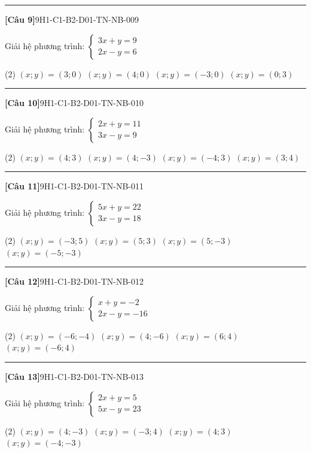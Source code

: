\documentclass[12pt,a4paper]{article}
\newif\ifloigiai
\newenvironment{cauhoi}[2]{%
  \par\medskip\noindent\rule{\textwidth}{0.4pt}\par\nopagebreak
  \noindent\textbf{[#1]}\hfill{\scriptsize\ttfamily #2}\par\nopagebreak\smallskip}{\par}
\newcommand{\dapan}[1]{\ifloigiai\par\smallskip\noindent\textit{Đáp án:} \textbf{#1}\par\fi}
\begin{document}
\begin{cauhoi}{Câu 9}{9H1-C1-B2-D01-TN-NB-009}
Giải hệ phương trình: $\begin{cases}3x + y=9\\ 2x - y=6\end{cases}$
\begin{tasks}(2)
\task $(x;y)=(3;0)$
\task $(x;y)=(4;0)$
\task $(x;y)=(-3;0)$
\task $(x;y)=(0;3)$
\end{tasks}
\dapan{A}
\end{cauhoi}
\begin{cauhoi}{Câu 10}{9H1-C1-B2-D01-TN-NB-010}
Giải hệ phương trình: $\begin{cases}2x + y=11\\ 3x - y=9\end{cases}$
\begin{tasks}(2)
\task $(x;y)=(4;3)$
\task $(x;y)=(4;-3)$
\task $(x;y)=(-4;3)$
\task $(x;y)=(3;4)$
\end{tasks}
\dapan{A}
\end{cauhoi}
\begin{cauhoi}{Câu 11}{9H1-C1-B2-D01-TN-NB-011}
Giải hệ phương trình: $\begin{cases}5x + y=22\\ 3x - y=18\end{cases}$
\begin{tasks}(2)
\task $(x;y)=(-3;5)$
\task $(x;y)=(5;3)$
\task $(x;y)=(5;-3)$
\task $(x;y)=(-5;-3)$
\end{tasks}
\dapan{C}
\end{cauhoi}
\begin{cauhoi}{Câu 12}{9H1-C1-B2-D01-TN-NB-012}
Giải hệ phương trình: $\begin{cases}x + y=-2\\ 2x - y=-16\end{cases}$
\begin{tasks}(2)
\task $(x;y)=(-6;-4)$
\task $(x;y)=(4;-6)$
\task $(x;y)=(6;4)$
\task $(x;y)=(-6;4)$
\end{tasks}
\dapan{D}
\end{cauhoi}
\begin{cauhoi}{Câu 13}{9H1-C1-B2-D01-TN-NB-013}
Giải hệ phương trình: $\begin{cases}2x + y=5\\ 5x - y=23\end{cases}$
\begin{tasks}(2)
\task $(x;y)=(4;-3)$
\task $(x;y)=(-3;4)$
\task $(x;y)=(4;3)$
\task $(x;y)=(-4;-3)$
\end{tasks}
\dapan{A}
\end{cauhoi}
\end{document}
